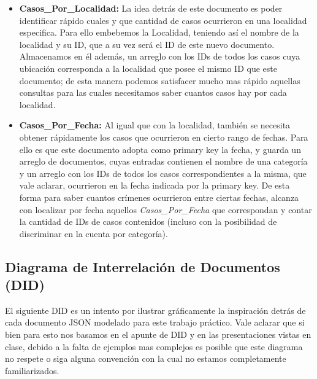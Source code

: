 \documentclass{article}
\theoremstyle{definition}
\theoremstyle{remark}
\begin{document}
\begin{itemize}
\item \textbf{Casos\_Por\_Localidad:} La idea detrás de este documento es poder identificar rápido cuales y que cantidad de casos ocurrieron en una localidad especifica. Para ello embebemos la Localidad, teniendo así el nombre de la localidad y su ID, que a su vez será el ID de este nuevo documento. Almacenamos en él además, un arreglo con los IDs de todos los casos cuya ubicación corresponda a la localidad que posee el mismo ID que este documento; de esta manera podemos satisfacer mucho mas rápido aquellas consultas para las cuales necesitamos saber cuantos casos hay por cada localidad.

\item \textbf{Casos\_Por\_Fecha:} Al igual que con la localidad, también se necesita obtener rápidamente los casos que ocurrieron en cierto rango de fechas. Para ello es que este documento adopta como primary key la fecha, y guarda un arreglo de documentos, cuyas entradas contienen el nombre de una categoría y un arreglo con los IDs de todos los casos correspondientes a la misma, que vale aclarar, ocurrieron en la fecha indicada por la primary key. De esta forma para saber cuantos crímenes ocurrieron entre ciertas fechas, alcanza con localizar por fecha aquellos \textit{Casos\_Por\_Fecha} que correspondan y contar la cantidad de IDs de casos contenidos (incluso con la posibilidad de discriminar en la cuenta por categoría).

\end{itemize}

\subsection{Diagrama de Interrelación de Documentos (DID)}

El siguiente DID es un intento por ilustrar gráficamente la inspiración detrás de cada documento JSON modelado para este trabajo práctico. Vale aclarar que si bien para esto nos basamos en el apunte de DID y en las presentaciones vistas en clase, debido a la falta de ejemplos mas complejos es posible que este diagrama no respete o siga alguna convención con la cual no estamos completamente familiarizados. 
\end{document}
